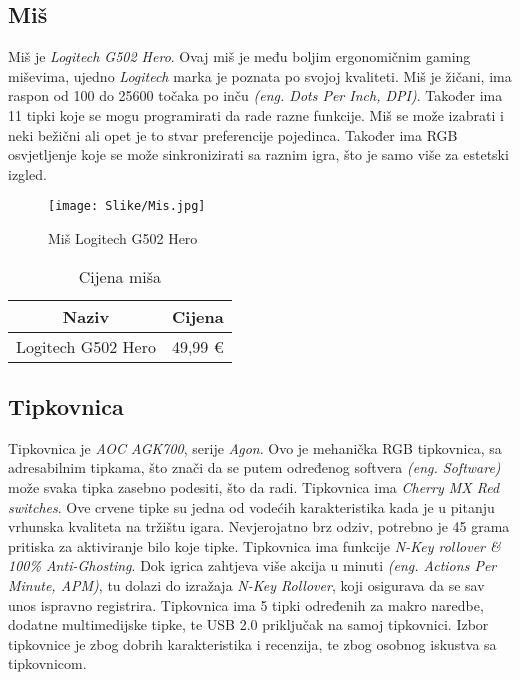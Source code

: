 \documentclass[14pt]{article}
\begin{document}
    \clearpage
    \subsection{Miš}
    Miš je \textit{Logitech G502 Hero}. Ovaj miš je među boljim ergonomičnim gaming miševima, ujedno \textit{Logitech} marka je poznata po svojoj kvaliteti. Miš je žičani, ima raspon od 100 do 25600 točaka po inču \emph{(eng. Dots Per Inch, DPI)}. Također ima 11 tipki koje se mogu programirati da rade razne funkcije. Miš se može izabrati i neki bežični ali opet je to stvar preferencije pojedinca. Također ima RGB osvjetljenje koje se može sinkronizirati sa raznim igra, što je samo više za estetski izgled.

    \begin{figure}[H]
        \centering
        \texttt{[image: Slike/Mis.jpg]}
        \caption{Miš Logitech G502 Hero}
        \label{fig:Mis}
    \end{figure}

    \begin{table}[H]
        \centering
        \begin{tabular}{|c|c|}
            \hline
            Naziv & Cijena \\
            \hline
            Logitech G502 Hero & 49,99 € \\
            \hline
        \end{tabular}
        \caption{Cijena miša}
        \label{tab:Mis}
    \end{table}

    \clearpage
    \subsection{Tipkovnica}
    Tipkovnica je \textit{AOC AGK700}, serije \textit{Agon}. Ovo je mehanička RGB tipkovnica, sa adresabilnim tipkama, što znači da se putem određenog softvera \emph{(eng. Software)} može svaka tipka zasebno podesiti, što da radi. Tipkovnica ima \textit{Cherry MX Red switches}. Ove crvene tipke su jedna od vodećih karakteristika kada je u pitanju vrhunska kvaliteta na tržištu igara. Nevjerojatno brz odziv, potrebno je 45 grama pritiska za aktiviranje bilo koje tipke. Tipkovnica ima funkcije \textit{N-Key rollover \& 100\% Anti-Ghosting}. Dok igrica zahtjeva više akcija u minuti \emph{(eng. Actions Per Minute, APM)}, tu dolazi do izražaja \textit{N-Key Rollover}, koji osigurava da se sav unos ispravno registrira. Tipkovnica ima 5 tipki određenih za makro naredbe, dodatne multimedijske tipke, te USB 2.0 priključak na samoj tipkovnici. Izbor tipkovnice je zbog dobrih karakteristika i recenzija, te zbog osobnog iskustva sa tipkovnicom.
\end{document}
